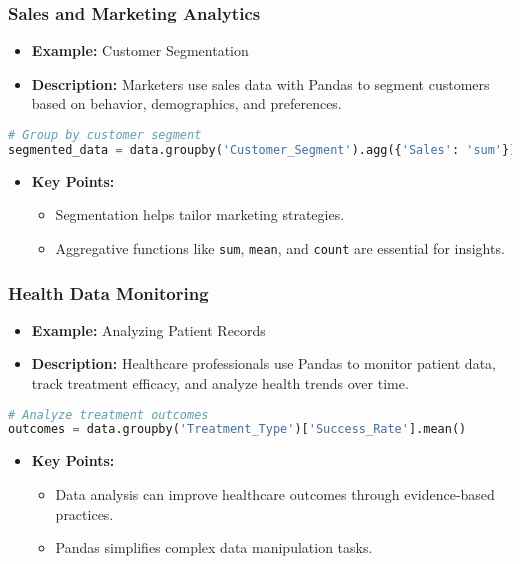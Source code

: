 \documentclass[aspectratio=169]{beamer}
\begin{document}
\begin{frame}[fragile]
    \frametitle{Sales and Marketing Analytics}
    \begin{itemize}
        \item \textbf{Example:} Customer Segmentation
        \item \textbf{Description:} Marketers use sales data with Pandas to segment customers based on behavior, demographics, and preferences.
    \end{itemize}
    
    \begin{lstlisting}[language=Python]
# Group by customer segment
segmented_data = data.groupby('Customer_Segment').agg({'Sales': 'sum'})
    \end{lstlisting}

    \begin{itemize}
        \item \textbf{Key Points:}
        \begin{itemize}
            \item Segmentation helps tailor marketing strategies.
            \item Aggregative functions like \texttt{sum}, \texttt{mean}, and \texttt{count} are essential for insights.
        \end{itemize}
    \end{itemize}
\end{frame}

\begin{frame}[fragile]
    \frametitle{Health Data Monitoring}
    \begin{itemize}
        \item \textbf{Example:} Analyzing Patient Records
        \item \textbf{Description:} Healthcare professionals use Pandas to monitor patient data, track treatment efficacy, and analyze health trends over time.
    \end{itemize}

    \begin{lstlisting}[language=Python]
# Analyze treatment outcomes
outcomes = data.groupby('Treatment_Type')['Success_Rate'].mean()
    \end{lstlisting}

    \begin{itemize}
        \item \textbf{Key Points:}
        \begin{itemize}
            \item Data analysis can improve healthcare outcomes through evidence-based practices.
            \item Pandas simplifies complex data manipulation tasks.
        \end{itemize}
    \end{itemize}
\end{frame}
\end{document}
